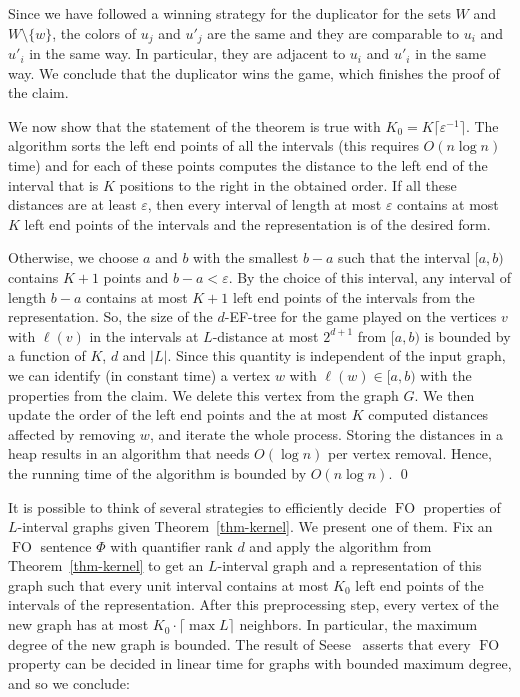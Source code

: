 \documentclass{CSML}
\newcommand{\FO}{\ensuremath{\operatorname{FO}}\xspace}
\theoremstyle{plain}\newtheorem{claim}[thm]{Claim}
\begin{document}
Since we have followed a winning strategy for the duplicator for the sets $W$ and $W\setminus\{w\}$,
the colors of $u_j$ and $u'_j$ are the same and they are comparable to $u_i$ and $u'_i$ in the same way.
In particular, they are adjacent to $u_i$ and $u'_i$ in the same way.
We conclude that the duplicator wins the game, which finishes the proof of the claim.

We now show that the statement of the theorem is true with $K_0=K\lceil\varepsilon^{-1}\rceil$.
The algorithm sorts the left end points of all the intervals (this requires $O(n\log n)$ time) and
for each of these points computes the distance to the left end of the interval 
that is $K$ positions to the right in the obtained order.
If all these distances are at least $\varepsilon$,
then every interval of length at most $\varepsilon$ contains at most $K$ left end points of
the intervals and the representation is of the desired form.

Otherwise, we choose $a$ and $b$ with the smallest $b-a$ such that the interval $[a,b)$ contains $K+1$ points and $b-a<\varepsilon$.
By the choice of this interval, any interval of length $b-a$
contains at most $K+1$ left end points of the intervals from the representation.
So, the size of the $d$-EF-tree for the game played on the vertices $v$ with $\ell(v)$ in the intervals at $L$-distance at most $2^{d+1}$
from $[a,b)$ is bounded by a function of $K$, $d$ and $|L|$.
Since this quantity is independent of the input graph, we can identify (in constant time) a vertex $w$ with $\ell(w)\in [a,b)$
with the properties from the claim. We delete this vertex from the graph $G$.
We then update the order of the left end points and the at most $K$ computed distances affected by removing $w$, and
iterate the whole process.
Storing the distances in a heap results in an algorithm that needs $O(\log n)$ per vertex removal.
Hence, the running time of the algorithm is bounded by $O(n\log n)$.
\qed

It is possible to think of several strategies to efficiently decide \FO properties of $L$-interval graphs
given Theorem~\ref{thm-kernel}.
We present one of them.
Fix an \FO sentence $\Phi$ with quantifier rank $d$ and
apply the algorithm from Theorem~\ref{thm-kernel} to get an $L$-interval graph
and a representation of this graph such that every unit interval contains at most
$K_0$ left end points of the intervals of
the representation. After this preprocessing step, every vertex of the new graph
has at most $K_0\cdot\lceil\max L\rceil$ neighbors. 
In particular, the maximum degree of the new graph is bounded.
The result of Seese~\cite{see96} asserts that every \FO property can be decided in linear time for graphs with bounded maximum degree, and so we conclude:
\end{document}
